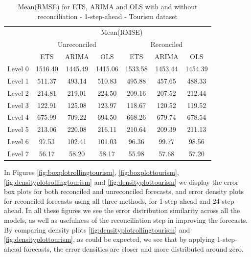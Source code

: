\documentclass[11pt,a4paper,]{article}
\begin{document}
\begin{table}[t]

\caption{\label{tab:Tourismdataresulrolling}Mean(RMSE) for ETS, ARIMA and OLS with and without reconciliation - 1-step-ahead - Tourism dataset}
\centering
\begin{tabular}{ccccccc}
\toprule
\multicolumn{1}{c}{} & \multicolumn{6}{c}{Mean(RMSE)} \\
\cmidrule(l{3pt}r{3pt}){2-7}
\multicolumn{1}{c}{} & \multicolumn{3}{c}{Unreconciled} & \multicolumn{3}{c}{Reconciled} \\
\cmidrule(l{3pt}r{3pt}){2-4} \cmidrule(l{3pt}r{3pt}){5-7}
 & ETS & ARIMA & OLS & ETS & ARIMA & OLS\\
\midrule
Level 0 & 1516.40 & 1445.49 & 1415.06 & 1533.58 & 1453.44 & 1454.39\\
Level 1 & 511.37 & 493.14 & 510.83 & 495.88 & 457.65 & 488.33\\
Level 2 & 214.81 & 219.01 & 224.50 & 209.16 & 207.52 & 212.44\\
Level 3 & 122.91 & 125.08 & 123.97 & 118.67 & 120.52 & 119.52\\
Level 4 & 675.99 & 709.22 & 694.50 & 668.26 & 679.74 & 678.54\\
Level 5 & 213.06 & 220.08 & 216.11 & 210.64 & 209.39 & 211.13\\
Level 6 & 97.53 & 102.41 & 101.03 & 96.36 & 99.77 & 98.56\\
Level 7 & 56.17 & 58.20 & 58.17 & 55.98 & 57.68 & 57.20\\
\bottomrule
\end{tabular}
\end{table}

In Figures \ref{fig:boxplotrollingtourism}, \ref{fig:boxplottourism}, \ref{fig:densityplotrollingtourism} and \ref{fig:densityplottourism} we display the error box plots for both reconciled and unreconciled forecasts, and error density plots for reconciled forecasts using all three methods, for 1-step-ahead and 24-step-ahead. In all these figures we see the error distribution similarity across all the models, as well as usefulness of the reconciliation step in improving the forecasts. By comparing density plots \ref{fig:densityplotrollingtourism} and \ref{fig:densityplottourism}, as could be expected, we see that by applying 1-step-ahead forecasts, the error densities are closer and more distributed around zero.
\end{document}
